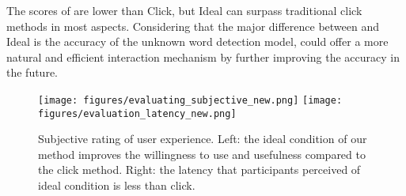 The scores of \name{} are lower than Click, but Ideal can surpass traditional click methods in most aspects. Considering that the major difference between \name{} and Ideal is the accuracy of the unknown word detection model, \name{} could offer a more natural and efficient interaction mechanism by further improving the accuracy in the future.

\begin{figure}[ht]
    \centering
    \texttt{[image: figures/evaluating\_subjective\_new.png]}
    \texttt{[image: figures/evaluation\_latency\_new.png]}
    \caption{Subjective rating of user experience. Left: the ideal condition of our method improves the willingness to use and usefulness compared to the click method. Right: the latency that participants perceived of ideal condition is less than click.}
    \label{fig:eval_subjective}
\end{figure}